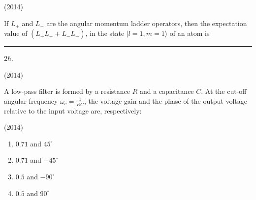     \hfill{(2014)}

    
    \item If $L_+$ and $L_-$ are the angular momentum ladder operators, then the expectation value of $(L_+ L_- + L_- L_+)$, in the state $|l=1, m=1\rangle$ of an atom is \rule{1cm}{0.15mm} $2\hbar$.
    
    \hfill{(2014)}

    
    \item A low-pass filter is formed by a resistance $R$ and a capacitance $C$. At the cut-off angular frequency $\omega_c = \frac{1}{RC}$, the voltage gain and the phase of the output voltage relative to the input voltage are, respectively:
    
    \hfill{(2014)}
    
    \begin{multicols}{4}
    \begin{enumerate}
        \item $0.71$ and $45^\circ$
        \item $0.71$ and $-45^\circ$
        \item $0.5$ and $-90^\circ$
        \item $0.5$ and $90^\circ$
    \end{enumerate}
    \end{multicols}
